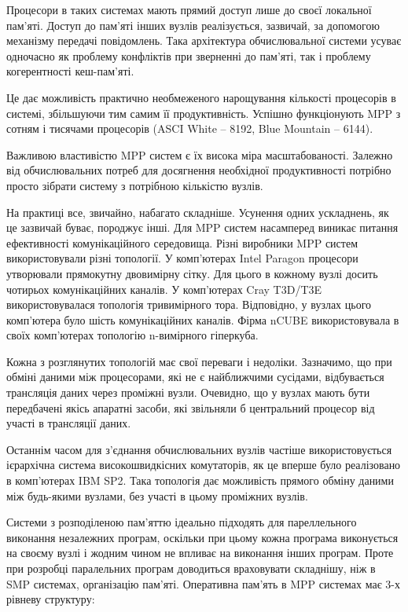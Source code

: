 Процесори в таких системах мають прямий доступ лише до своєї локальної пам'яті. Доступ до пам'яті інших вузлів реалізується, зазвичай, за допомогою механізму передачі повідомлень. Така архітектура обчислювальної системи усуває одночасно як проблему конфліктів при зверненні до пам'яті, так і проблему когерентності кеш-пам'яті. 

Це дає можливість практично необмеженого нарощування кількості процесорів в системі, збільшуючи тим самим її продуктивність. Успішно функціонують MPP з сотням і тисячами процесорів (ASCI White – 8192, Blue Mountain – 6144). 

Важливою властивістю MPP систем є їх висока міра масштабованості. Залежно від обчислювальних потреб для досягнення необхідної продуктивності потрібно просто зібрати систему з потрібною кількістю вузлів.

На практиці все, звичайно, набагато складніше. Усунення одних ускладнень, як це зазвичай буває, породжує інші. Для MPP систем насамперед виникає питання ефективності комунікаційного середовища. Різні виробники MPP систем використовували різні топології. У комп'ютерах Intel Paragon процесори утворювали прямокутну двовимірну сітку. Для цього в кожному вузлі досить чотирьох комунікаційних каналів. У комп'ютерах Cray T3D/T3E використовувалася топологія тривимірного тора. Відповідно, у вузлах цього комп'ютера було шість комунікаційних каналів. Фірма nCUBE використовувала в своїх комп'ютерах топологію n-вимірного гіперкуба. 

Кожна з розглянутих топологій має свої переваги і недоліки. Зазначимо, що при обміні даними між процесорами, які не є найближчими сусідами, відбувається трансляція даних через проміжні вузли. Очевидно, що у вузлах мають бути передбачені якісь апаратні засоби, які звільняли б центральний процесор від участі в трансляції даних. 

Останнім часом для з'єднання обчислювальних вузлів частіше використовується ієрархічна система високошвидкісних комутаторів, як це вперше було реалізовано в комп'ютерах IBM SP2. Така топологія дає можливість прямого обміну даними між будь-якими вузлами, без участі в цьому проміжних вузлів.

Системи з розподіленою пам'яттю ідеально підходять для пареллельного виконання незалежних програм, оскільки при цьому кожна програма виконується на своєму вузлі і жодним чином не впливає на виконання інших програм. Проте при розробці паралельних програм доводиться враховувати складнішу, ніж в SMP системах, організацію пам'яті. Оперативна пам'ять в MPP системах має 3-х рівневу структуру:

